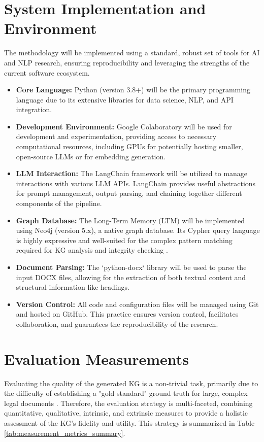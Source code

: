 \section{System Implementation and Environment}
The methodology will be implemented using a standard, robust set of tools for AI and NLP research, ensuring reproducibility and leveraging the strengths of the current software ecosystem.
\begin{itemize}
    \item \textbf{Core Language:} Python (version 3.8+) will be the primary programming language due to its extensive libraries for data science, NLP, and API integration.
    \item \textbf{Development Environment:} Google Colaboratory will be used for development and experimentation, providing access to necessary computational resources, including GPUs for potentially hosting smaller, open-source LLMs or for embedding generation.
    \item \textbf{LLM Interaction:} The LangChain framework \parencite{RefWorks:RefID:101-zhao2023survey} will be utilized to manage interactions with various LLM APIs. LangChain provides useful abstractions for prompt management, output parsing, and chaining together different components of the pipeline.
    \item \textbf{Graph Database:} The Long-Term Memory (LTM) will be implemented using Neo4j (version 5.x), a native graph database. Its Cypher query language is highly expressive and well-suited for the complex pattern matching required for KG analysis and integrity checking \parencite{RefWorks:RefID:111-kumar2013querying}.
    \item \textbf{Document Parsing:} The `python-docx` library will be used to parse the input DOCX files, allowing for the extraction of both textual content and structural information like headings.
    \item \textbf{Version Control:} All code and configuration files will be managed using Git and hosted on GitHub. This practice ensures version control, facilitates collaboration, and guarantees the reproducibility of the research.
\end{itemize}

\section{Evaluation Measurements}
Evaluating the quality of the generated KG is a non-trivial task, primarily due to the difficulty of establishing a "gold standard" ground truth for large, complex legal documents \parencite{RefWorks:RefID:76-dhani2021similar}. Therefore, the evaluation strategy is multi-faceted, combining quantitative, qualitative, intrinsic, and extrinsic measures to provide a holistic assessment of the KG's fidelity and utility. This strategy is summarized in Table \cref{tab:measurement_metrics_summary}.

